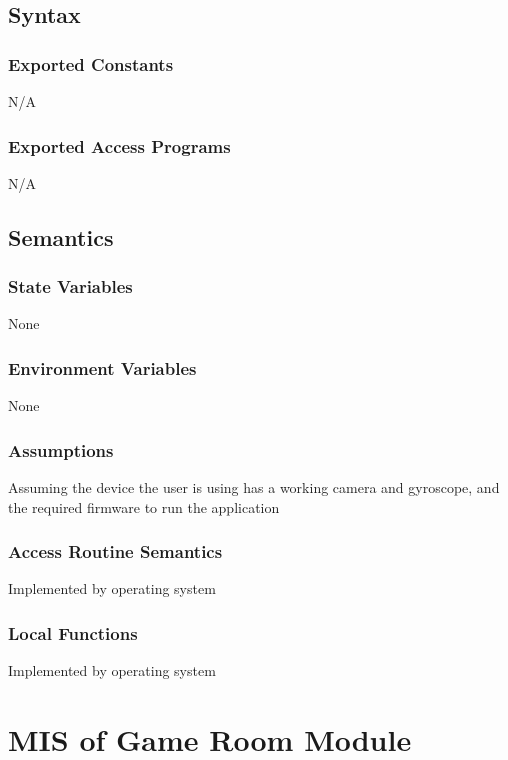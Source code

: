 \documentclass[12pt, titlepage]{article}
\begin{document}
\subsection{Syntax}

\subsubsection{Exported Constants}
N/A
\subsubsection{Exported Access Programs}
N/A
\subsection{Semantics}

\subsubsection{State Variables}

None

\subsubsection{Environment Variables}

None

\subsubsection{Assumptions}

Assuming the device the user is using has a working camera and gyroscope, and the required firmware to run the application

\subsubsection{Access Routine Semantics}

Implemented by operating system

\subsubsection{Local Functions}

Implemented by operating system

\newpage

\section{MIS of Game Room Module} \label{GameRoomModule} 
\end{document}
